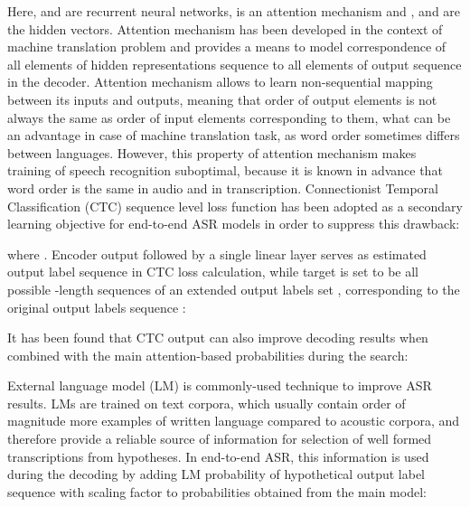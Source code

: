 \documentclass[12pt,a4paper]{article}
\begin{document}
Here,  and  are
recurrent neural  networks, 
is an attention mechanism and
,  and 
are the hidden vectors.
Attention mechanism has been developed in the context of machine translation
problem \cite{bahdanau2014neural} and provides a means to model correspondence of all elements
of hidden representations sequence to all elements of output sequence
in the decoder. Attention mechanism allows to learn non-sequential
mapping between its inputs and outputs, meaning that
order of output elements is not always the same as order
of input elements corresponding to them,
what can be an advantage in case of machine translation task,
as word order sometimes differs between languages.
However, this property of attention mechanism makes training
of speech recognition suboptimal, because it is known in advance
that word order is the same in audio and in transcription.
Connectionist Temporal Classification (CTC) sequence level loss function \cite{graves2006connectionist} has been adopted as a secondary learning
objective for end-to-end ASR models in order to suppress this drawback:

where .
Encoder output followed by a single linear layer serves as estimated
output label sequence in CTC loss calculation, while target is set to be
all possible -length sequences of an extended output labels set
,
corresponding to the original output labels sequence :

It has been found that CTC output can also improve decoding
results when combined with the main attention-based probabilities
during the search:


External language model (LM) is commonly-used
technique to improve ASR results. LMs are trained on text corpora,
which usually contain order of magnitude more examples of written language
compared to acoustic corpora, and therefore provide a reliable source of
information for selection of well formed transcriptions from hypotheses.
In end-to-end ASR, this information is used during
the decoding by adding LM probability of hypothetical output label sequence
with scaling factor 
to probabilities obtained from the main model:
\end{document}
